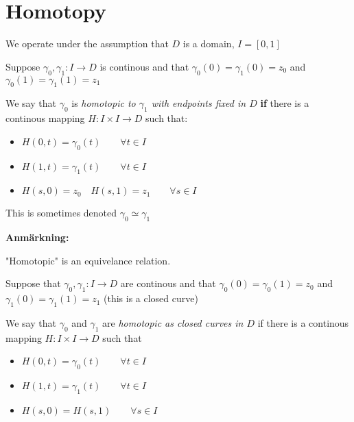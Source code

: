\section{Homotopy}
\par\bigskip
\noindent We operate under the assumption that $D$ is a domain, $I = [0,1]$
\par\bigskip
\begin{theo}{}
  Suppose $\gamma_0,\gamma_1:I\to D$ is continous and that $\gamma_0(0) = \gamma_1(0)=z_0$ and $\gamma_0(1) = \gamma_1(1) = z_1$
  \par\bigskip
  \noindent We say that $\gamma_0$ is \textit{homotopic to $\gamma_1$ with endpoints fixed in $D$} \textbf{if} there is a continous mapping $H:I\times I\to D$ such that:\par
  \begin{itemize}
    \item $H(0,t)=\gamma_0(t)\qquad\forall t\in I$
    \item $H(1,t)=\gamma_1(t)\qquad\forall t\in I$
    \item $H(s,0) = z_0\quad H(s,1) = z_1\qquad\forall s\in I$
  \end{itemize}
  \par\bigskip
  \noindent This is sometimes denoted $\gamma_0\simeq\gamma_1$
\end{theo}
\par\bigskip
\noindent\textbf{Anmärkning:}\par
\noindent "Homotopic" is an equivelance relation.
\par\bigskip
\begin{theo}[]{}
  Suppose that $\gamma_0, \gamma_1:I\to D$ are continous and that $\gamma_0(0)= \gamma_0(1) = z_0$ and  $\gamma_1(0) = \gamma_1(1) = z_1$ (this is a closed curve)
  \par\bigskip
  \noindent We say that $\gamma_0$ and $\gamma_1$ are \textit{homotopic as closed curves in $D$} if there is a continous mapping $H:I\times I\to D$  such that\par
  \begin{itemize}
    \item $H(0,t) = \gamma_0(t)\qquad\forall t\in I$
    \item $H(1,t) = \gamma_1(t)\qquad\forall t\in I$
    \item $H(s,0) = H(s,1)\qquad\forall s \in I$
  \end{itemize}
\end{theo}
\par\bigskip
